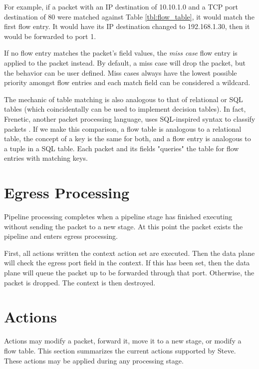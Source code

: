 For example, if a packet with an IP destination of 10.10.1.0 and a TCP port destination of 80 were matched against Table \ref{tbl:flow_table}, it would match the first flow entry. It would have its IP destination changed to 192.168.1.30, then it would be forwarded to port 1.

If no flow entry matches the packet's field values, the \textit{miss case} flow
entry is applied to the packet instead. By default, a miss case will drop the
packet, but the behavior can be user defined. Miss cases always have the lowest
possible priority amongst flow entries and each match field can be considered a
wildcard.

The mechanic of table matching is also analogous to that of relational or SQL
tables (which coincidentally can be used to implement decision tables). In fact,
Frenetic, another packet processing language, uses SQL-inspired syntax to
classify packets \cite{foster2011frenetic, foster2013frenetic}. If we make this
comparison, a flow table is analogous to a relational table, the concept of a
key is the same for both, and a flow entry is analogous to a tuple in a SQL
table. Each packet and its fields "queries" the table for flow entries with
matching keys.

\section{Egress Processing} \label{egress_desc}

Pipeline processing completes when a pipeline stage has finished executing
without sending the packet to a new stage. At this point the packet exists the
pipeline and enters egress processing.

First, all actions written the context action set are executed. Then the data
plane will check the egress port field in the context. If this has been set,
then the data plane will queue the packet up to be forwarded through that port.
Otherwise, the packet is dropped. The context is then destroyed.

\section{Actions} \label{action_desc}

Actions may modify a packet, forward it, move it to a new stage, or modify a
flow table. This section summarizes the current actions supported by Steve.
These actions may be applied during any processing stage.

